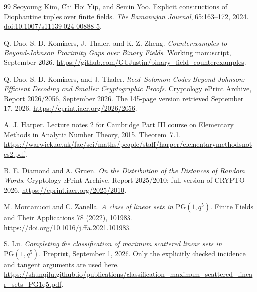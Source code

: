 \documentclass[11pt,letterpaper]{article}
\theoremstyle{definition}
\theoremstyle{remark}
\begin{document}
\begin{thebibliography}{99}
Seoyoung Kim, Chi Hoi Yip, and Semin Yoo.
\newblock Explicit constructions of Diophantine tuples over finite fields.
\newblock \emph{The Ramanujan Journal}, 65:163--172, 2024.
\newblock \href{https://doi.org/10.1007/s11139-024-00888-5}{doi:10.1007/s11139-024-00888-5}.

 Q. Dao, S. D. Kominers, J. Thaler,
and K. Z. Zheng.
\emph{Counterexamples to Beyond-Johnson Proximity Gaps over Binary Fields}.
Working manuscript, September 2026.
\url{https://github.com/GUJustin/binary_field_counterexamples}.

 Q. Dao, S. D. Kominers, and J. Thaler.
\emph{Reed--Solomon Codes Beyond Johnson: Efficient Decoding and Smaller
Cryptographic Proofs}. Cryptology ePrint Archive, Report 2026/2056,
September 2026. The 145-page version retrieved September 17, 2026.
\url{https://eprint.iacr.org/2026/2056}.

 A. J. Harper.
Lecture notes 2 for Cambridge Part III course on Elementary Methods in
Analytic Number Theory, 2015. Theorem~7.1.
\url{https://warwick.ac.uk/fac/sci/maths/people/staff/harper/elementarymethodsnotes2.pdf}.

 B. E. Diamond and A. Gruen.
\emph{On the Distribution of the Distances of Random Words}.
Cryptology ePrint Archive, Report 2025/2010; full version of CRYPTO 2026.
\url{https://eprint.iacr.org/2025/2010}.

 M. Montanucci and C. Zanella.
\emph{A class of linear sets in $\mathrm{PG}(1,q^5)$}.
Finite Fields and Their Applications 78 (2022), 101983.
\url{https://doi.org/10.1016/j.ffa.2021.101983}.

 S. Lu.
\emph{Completing the classification of maximum scattered linear sets
in $\mathrm{PG}(1,q^5)$}. Preprint, September 1, 2026.
Only the explicitly checked incidence and tangent arguments are used here.
\url{https://shunqilu.github.io/publications/classification_maximum_scattered_linear_sets_PG1q5.pdf}.

\end{thebibliography}
\end{document}
